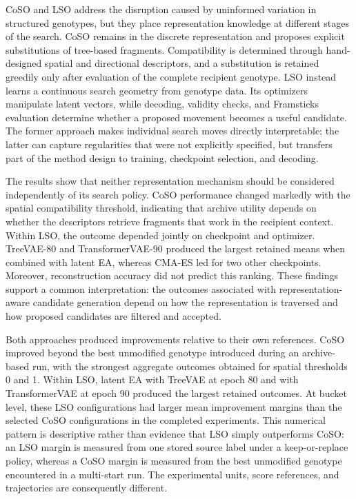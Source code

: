 CoSO and LSO address the disruption caused by uninformed variation in structured genotypes, but they place representation knowledge at different stages of the search. CoSO remains in the discrete \fone{} representation and proposes explicit substitutions of tree-based fragments. Compatibility is determined through hand-designed spatial and directional descriptors, and a substitution is retained greedily only after evaluation of the complete recipient genotype. LSO instead learns a continuous search geometry from genotype data. Its optimizers manipulate latent vectors, while decoding, validity checks, and Framsticks evaluation determine whether a proposed movement becomes a useful \fone{} candidate. The former approach makes individual search moves directly interpretable; the latter can capture regularities that were not explicitly specified, but transfers part of the method design to training, checkpoint selection, and decoding.

The results show that neither representation mechanism should be considered independently of its search policy. CoSO performance changed markedly with the spatial compatibility threshold, indicating that archive utility depends on whether the descriptors retrieve fragments that work in the recipient context. Within LSO, the outcome depended jointly on checkpoint and optimizer. TreeVAE-80 and TransformerVAE-90 produced the largest retained means when combined with latent EA, whereas CMA-ES led for two other checkpoints. Moreover, reconstruction accuracy did not predict this ranking. These findings support a common interpretation: the outcomes associated with representation-aware candidate generation depend on how the representation is traversed and how proposed candidates are filtered and accepted.

Both approaches produced improvements relative to their own references. CoSO improved beyond the best unmodified genotype introduced during an archive-based run, with the strongest aggregate outcomes obtained for spatial thresholds 0 and 1. Within LSO, latent EA with TreeVAE at epoch 80 and with TransformerVAE at epoch 90 produced the largest retained outcomes. At bucket level, these LSO configurations had larger mean improvement margins than the selected CoSO configurations in the completed experiments. This numerical pattern is descriptive rather than evidence that LSO simply outperforms CoSO: an LSO margin is measured from one stored source label under a keep-or-replace policy, whereas a CoSO margin is measured from the best unmodified genotype encountered in a multi-start run. The experimental units, score references, and trajectories are consequently different.

